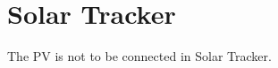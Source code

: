 \section{Solar Tracker}
\label{ch:solar_tracker}

The PV is not to be connected in Solar Tracker.

\newpage
\begin{figure}
	
\end{figure}